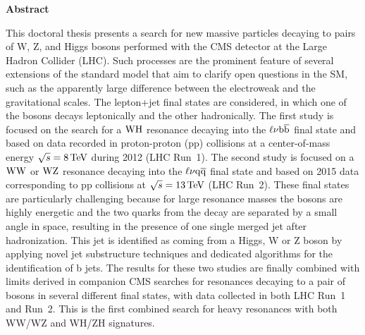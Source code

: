\vspace*{\fill}

\begin{center}
\Large
\textbf{Abstract}
\end{center}

\small
\noindent This doctoral thesis presents a search for new massive particles decaying to pairs of W, Z, and Higgs bosons performed with the CMS detector at the Large Hadron Collider (LHC).
Such processes are the prominent feature of several extensions of the standard model that aim to clarify open questions in the SM, such as the apparently large difference between the electroweak and the gravitational scales. 
The lepton+jet final states are considered, in which one of the bosons decays leptonically and the other hadronically. 
The first study is focused on the search for a $\mathrm{W}\mathrm{H}$ resonance decaying into the $\ell\nu{\mathrm{b}\overline{\mathrm{b}}}$ final state and based on data recorded in proton-proton (pp) collisions at a center-of-mass energy $\sqrt{s} = 8\,\text{Te\hspace{-.08em}V}$ during 2012 (LHC Run~1).
The second study is focused on a $\mathrm{W}\mathrm{W}$ or $\mathrm{W}\mathrm{Z}$ resonance decaying into the $\ell\nu\mathrm{q}\overline{\mathrm{q}}$ final state and based on 2015 data corresponding to pp collisions at $\sqrt{s} = 13\,\text{Te\hspace{-.08em}V}$ (LHC Run~2).
These final states are particularly challenging because for large resonance masses the bosons are highly energetic and the two quarks from the decay are separated by a small angle in space, resulting in the presence of one single merged jet after hadronization. This jet is identified as coming from a Higgs, W or Z boson by applying novel jet substructure techniques and dedicated algorithms for the identification of b jets.
The results for these two studies are finally combined with limits derived in companion CMS searches for resonances decaying to a pair of bosons in several different final states, with data collected in both LHC Run~1 and Run~2.
This is the first combined search for heavy resonances with both WW/WZ and WH/ZH signatures.\\

